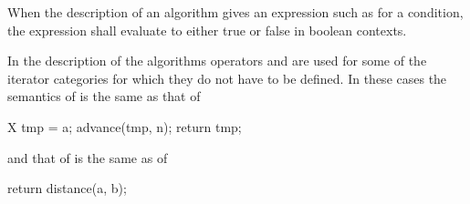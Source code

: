 \begin{removedblock}
\pnum
When the description of an algorithm gives an expression such as
for a condition, the expression shall evaluate to
either true or false in boolean contexts.
\end{removedblock}

\pnum
In the description of the algorithms operators
\tcode{+}
and
\tcode{-}
are used for some of the iterator categories for which
they do not have to be defined.
In these cases the semantics of
is the same as that of

\begin{codeblock}
X tmp = a;
advance(tmp, n);
return tmp;
\end{codeblock}

and that of
is the same as of

\begin{codeblock}
return distance(a, b);
\end{codeblock}


